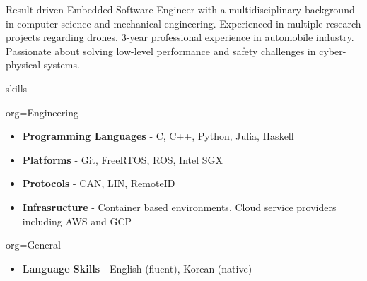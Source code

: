 \documentclass{resume}
\begin{document}
\makeheader
\begin{ResumeSection}
    Result-driven Embedded Software Engineer with a multidisciplinary background in computer science and mechanical engineering. Experienced in multiple research projects regarding drones. 3-year professional experience in automobile industry. Passionate about solving low-level performance and safety challenges in cyber-physical systems.
\end{ResumeSection}
\begin{ResumeSection}{skills}
    \newcommand{\skill}[2]{\textbf{#1} - #2}
    \begin{ResumeSubsection}{org=Engineering}
        \begin{itemize}
            \item \skill{Programming Languages}{C, C++, Python, Julia, Haskell}
            \item \skill{Platforms}{Git, FreeRTOS, ROS, Intel SGX}
            \item \skill{Protocols}{CAN, LIN, RemoteID}
            \item \skill{Infrasructure}{Container based environments, Cloud service providers including AWS and GCP}
        \end{itemize}
    \end{ResumeSubsection}
    \begin{ResumeSubsection}{org=General}
        \begin{itemize}
            \item \skill{Language Skills}{English (fluent), Korean (native)}
        \end{itemize}
    \end{ResumeSubsection}
\end{ResumeSection}
\end{document}
